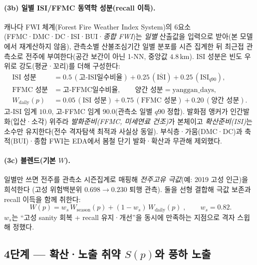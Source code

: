 \documentclass[11pt,a4paper]{article}
\begin{document}
\paragraph{(3b) 일별 ISI/FFMC 동역학 성분(recall 이득).}
캐나다 FWI 체계(Forest Fire Weather Index System)의 6요소(FFMC·DMC·DC·ISI·BUI·\emph{종합 FWI})는 \emph{일별} 산출값을 입력으로 받아(본 모델에서 재계산하지 않음), 관측소별 산불조심기간 일별 분포를 시즌 집계한 뒤 최근접 관측소로 전주에 부여한다(공간 보간이 아닌 1-NN, 중앙값 $4.8$\,km). ISI 성분은 빈도
우위로 강도(평균·꼬리)를 더해 구성한다:
\begin{align}
\text{ISI 성분}&=0.5\,(\text{고-ISI일수비율})+0.25\,(\overline{\text{ISI}})+0.25\,(\text{ISI}_{q90}),\\
\text{FFMC 성분}&=\text{고-FFMC일수비율},\qquad \text{양간 성분}=\mathrm{yanggan\_days},\\
W_{\text{daily}}(p)&=0.05\,(\text{ISI 성분})+0.75\,(\text{FFMC 성분})+0.20\,(\text{양간 성분}).
\label{eq:wdaily}
\end{align}
고-ISI 임계 $10.0$, 고-FFMC 임계 $90.0$(관측소 일별 $q90$ 정합). 발화점 앵커가 인간발화(입산·소각)
위주라 \emph{발화준비(FFMC, 미세연료 건조)}가 본체이고 \emph{확산준비(ISI)}는 소수만 유지한다(전수
격자탐색 최적과 사실상 동일). 부식층·가뭄(DMC·DC)과 축적(BUI)·종합 FWI는 EDA에서 봄철 단기 발화·확산과 무관해 제외했다.

\paragraph{(3c) 블렌드(기본 $W$).}
일별만 쓰면 전주를 관측소 시즌집계로 매핑해 \emph{전주고유 극값}(예: 2019 고성 인근)을 희석한다
(고성 위험백분위 $0.698\!\to\!0.230$ 퇴행 관측). 둘을 선형 결합해 극값 보존과 recall 이득을 함께 취한다:
\begin{equation}
\boxed{\;W(p)=w_s\,W_{\text{season}}(p)+(1-w_s)\,W_{\text{daily}}(p)\;},\qquad w_s=0.82.
\label{eq:wblend}
\end{equation}
$w_s$는 ``고성 sanity 회복 + recall 유지·개선''을 동시에 만족하는 지점으로 격자 스윕해 정했다.

\subsection{4단계 — 확산·노출 취약 $S(p)$와 풍하 노출}\label{sec:exposure}
\end{document}
